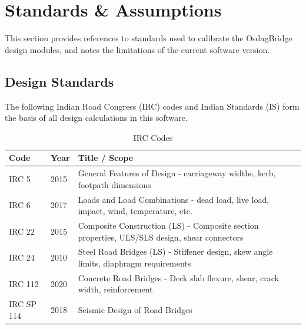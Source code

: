 \documentclass[12pt,a4paper]{report}
\numberwithin{figure}{chapter}
\begin{document}
\chapter{Standards \& Assumptions}
\label{ch:Design Standards}

This section provides references to standards used to calibrate the OsdagBridge
design modules, and notes the limitations of the current software version.

\section{Design Standards}
\label{sec:design_standards}

The following Indian Road Congress (IRC) codes and Indian Standards (IS) 
form the basis of all design calculations in this software.

\vspace{0.5cm}

\begin{table}[H]
\centering
{}
\caption{IRC Codes}
\begin{tabular}{|C{2.01cm}|C{1.28cm}|L{10.85cm}|}
\hline
\textbf{Code} & \textbf{Year} & \textbf{Title / Scope} \\
\hline
IRC 5 & 2015 & General Features of Design - carriageway widths, kerb, footpath dimensions \\
\hline
IRC 6 & 2017 & Loads and Load Combinations - dead load, live load, impact, wind, temperature, etc. \\
\hline
IRC 22 & 2015 & Composite Construction (LS) - Composite section properties, ULS/SLS design, shear connectors \\
\hline
IRC 24 & 2010 & Steel Road Bridges (LS) - Stiffener design, skew angle limits, diaphragm requirements \\
\hline
IRC 112 & 2020 & Concrete Road Bridges - Deck slab flexure, shear, crack width, reinforcement \\
\hline
IRC SP 114 & 2018 & Seismic Design of Road Bridges \\
\hline
\end{tabular}
\end{table}
\end{document}
